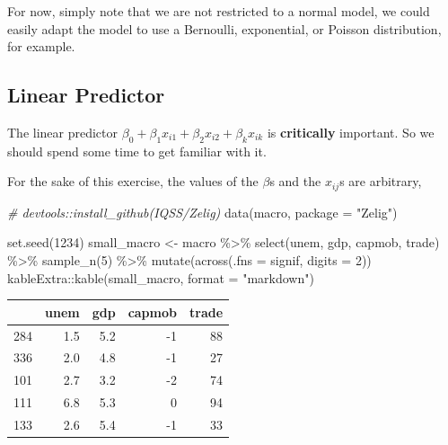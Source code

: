 \documentclass[
]{book}
\newenvironment{Shaded}{\begin{snugshade}}{\end{snugshade}}
\newcommand{\AttributeTok}[1]{\textcolor[rgb]{0.77,0.63,0.00}{#1}}
\newcommand{\CommentTok}[1]{\textcolor[rgb]{0.56,0.35,0.01}{\textit{#1}}}
\newcommand{\DecValTok}[1]{\textcolor[rgb]{0.00,0.00,0.81}{#1}}
\newcommand{\FunctionTok}[1]{\textcolor[rgb]{0.00,0.00,0.00}{#1}}
\newcommand{\NormalTok}[1]{#1}
\newcommand{\OtherTok}[1]{\textcolor[rgb]{0.56,0.35,0.01}{#1}}
\newcommand{\SpecialCharTok}[1]{\textcolor[rgb]{0.00,0.00,0.00}{#1}}
\newcommand{\StringTok}[1]{\textcolor[rgb]{0.31,0.60,0.02}{#1}}
\begin{document}
For now, simply note that we are not restricted to a normal model, we could easily adapt the model to use a Bernoulli, exponential, or Poisson distribution, for example.

\hypertarget{linear-predictor}{%
\subsection{Linear Predictor}\label{linear-predictor}}

The linear predictor \(\beta_0 + \beta_1 x_{i1} + \beta_2 x_{i2} + \beta_k x_{ik}\) is \textbf{critically} important. So we should spend some time to get familiar with it.

For the sake of this exercise, the values of the \(\beta\)s and the \(x_{ij}\)s are arbitrary,

\begin{Shaded}
\begin{Highlighting}[]
\CommentTok{\# devtools::install\_github(\textquotesingle{}IQSS/Zelig\textquotesingle{})}
\FunctionTok{data}\NormalTok{(macro, }\AttributeTok{package =} \StringTok{"Zelig"}\NormalTok{)}

\FunctionTok{set.seed}\NormalTok{(}\DecValTok{1234}\NormalTok{)}
\NormalTok{small\_macro }\OtherTok{\textless{}{-}}\NormalTok{ macro }\SpecialCharTok{\%\textgreater{}\%}
  \FunctionTok{select}\NormalTok{(unem, gdp, capmob, trade) }\SpecialCharTok{\%\textgreater{}\%}
  \FunctionTok{sample\_n}\NormalTok{(}\DecValTok{5}\NormalTok{) }\SpecialCharTok{\%\textgreater{}\%}
  \FunctionTok{mutate}\NormalTok{(}\FunctionTok{across}\NormalTok{(}\AttributeTok{.fns =}\NormalTok{ signif, }\AttributeTok{digits =} \DecValTok{2}\NormalTok{)) }
\NormalTok{kableExtra}\SpecialCharTok{::}\FunctionTok{kable}\NormalTok{(small\_macro, }\AttributeTok{format =} \StringTok{"markdown"}\NormalTok{)}
\end{Highlighting}
\end{Shaded}

\begin{longtable}[]{@{}lrrrr@{}}
\toprule
& unem & gdp & capmob & trade \\
\midrule
\endhead
284 & 1.5 & 5.2 & -1 & 88 \\
336 & 2.0 & 4.8 & -1 & 27 \\
101 & 2.7 & 3.2 & -2 & 74 \\
111 & 6.8 & 5.3 & 0 & 94 \\
133 & 2.6 & 5.4 & -1 & 33 \\
\bottomrule
\end{longtable}
\end{document}
